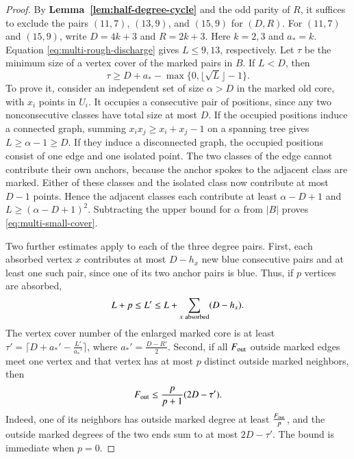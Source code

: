 \begin{proof}
By \textbf{Lemma~\ref{lem:half-degree-cycle}} and the odd parity of $R$,
it suffices to exclude the pairs $(11,7)$, $(13,9)$, and $(15,9)$ for $(D,R)$.
For $(11,7)$ and $(15,9)$, write $D=4k+3$ and $R=2k+3$.
Here $k=2,3$ and $a_*=k$. Equation \eqref{eq:multi-rough-discharge}
gives $L\le9,13$, respectively. Let $\tau$ be the minimum size
of a vertex cover of the marked pairs in $B$. If $L<D$, then
\begin{equation}\label{eq:multi-small-cover}
 \tau\ge D+a_*-\max\{0,\lfloor\sqrt L\rfloor-1\}.
\end{equation}
To prove it, consider an independent set of size $\alpha>D$ in
the marked old core, with $x_i$ points in $U_i$. It occupies a
consecutive pair of positions, since any two nonconsecutive classes
have total size at most $D$. If the occupied positions induce a
connected graph, summing $x_i x_j\ge x_i+x_j-1$ on a spanning tree
gives $L\ge\alpha-1\ge D$. If they induce a disconnected graph,
the occupied positions consist of one edge and one isolated point.
The two classes of the edge cannot contribute their own anchors,
because the anchor spokes to the adjacent class are marked. Either
of these classes and the isolated class now contribute at most
$D-1$ points. Hence the adjacent classes
each contribute at least $\alpha-D+1$ and $L\ge(\alpha-D+1)^2$.
Subtracting the upper bound for $\alpha$ from $|B|$ proves
\eqref{eq:multi-small-cover}.

Two further estimates apply to each of the three degree pairs. First, each absorbed vertex
$x$ contributes at most $D-h_x$ new blue consecutive pairs and at
least one such pair, since one of its two anchor pairs is blue.
Thus, if $p$ vertices are absorbed,
\begin{equation}\label{eq:multi-new-blue}
 L+p\le L'\le L+\sum_{x\ {\rm absorbed}}(D-h_x).
\end{equation}
The vertex cover number of the enlarged marked core is at least
$\tau'=\lceil D+a_*'-\frac{L'}{a_*'}\rceil$,
where $a_*'=\frac{D-R'}{2}$. Second, if all $F_{\rm out}$ outside marked
edges meet one vertex and that vertex has at most $p$
distinct outside marked neighbors, then
\begin{equation}\label{eq:multi-center-cut}
 F_{\rm out}\le\frac{p}{p+1}(2D-\tau').
\end{equation}
Indeed, one of its neighbors has outside marked degree at least
$\frac{F_{\rm out}}{p}$, and the outside marked degrees of the two ends sum to
at most $2D-\tau'$. The bound is immediate when $p=0$.


\end{proof}
